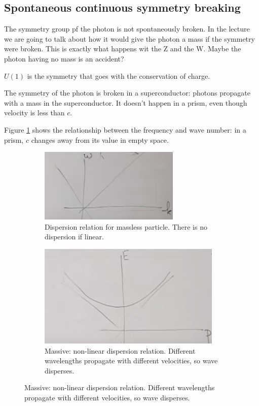 \documentclass[]{article}
\begin{document}
\subsection{Spontaneous continuous symmetry breaking}
The symmetry group pf the photon is not spontaneously broken. In the lecture we are going to talk about how it would give the photon a mass if the symmetry were broken. This is exactly what happens wit the Z and the W. Maybe the photon having no mass is an accident?

$U(1)$ is the symmetry that goes with the conservation of charge.

The symmetry of the photon is broken in a superconductor: photons propagate with a mass in the superconductor. It doesn't happen in a prism, even though velocity is less than $c$.

Figure \ref{fig:2-8-massless} shows the relationship between the frequency and wave number: in a prism, $c$ changes away from its value in empty space. 

\begin{figure}[H]
	\caption{Dispersion relations for Massive and Massless particles}
	\begin{subfigure}[t]{0.45\textwidth}
		\caption{Dispersion relation for massless particle. There is no dispersion if linear.}\label{fig:2-8-massless}
		\includegraphics[width=\textwidth]{2-8-massless}
	\end{subfigure}
	\begin{subfigure}[t]{0.45\textwidth}
		\caption{Massive: non-linear dispersion relation. Different wavelengths propagate with different velocities, so wave disperses.}\label{fig:2-8-massive}
		\includegraphics[width=\textwidth]{2-8-massive}
	\end{subfigure}
\end{figure}
\end{document}
